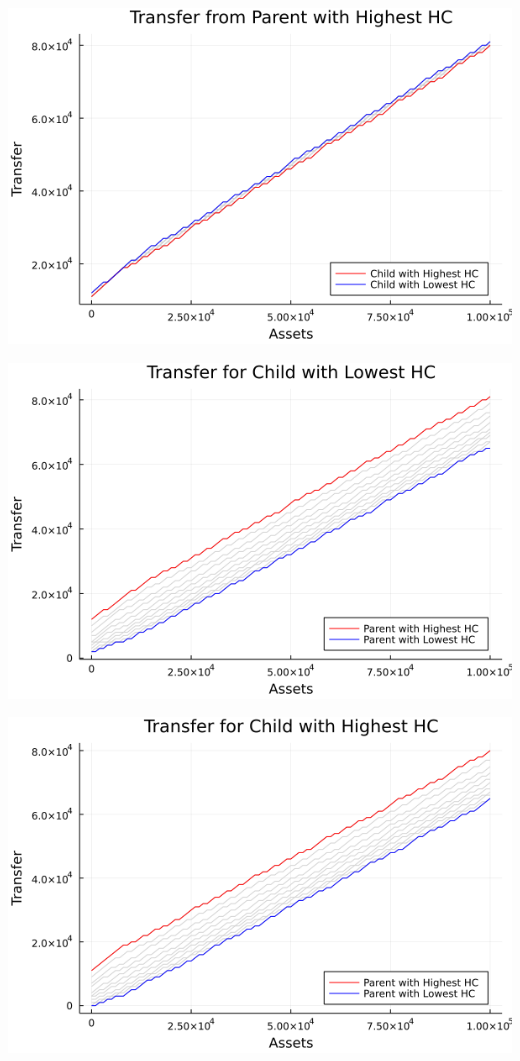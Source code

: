 \documentclass{article}
\begin{document}
\begin{enumerate}
\begin{itemize}
\begin{center}
\includegraphics[scale =0.5]{tau_p_h}

\includegraphics[scale =0.5]{tau_c_l}

\includegraphics[scale =0.5]{tau_c_h}


\end{center}
\end{itemize}
\end{enumerate}
\end{document}
